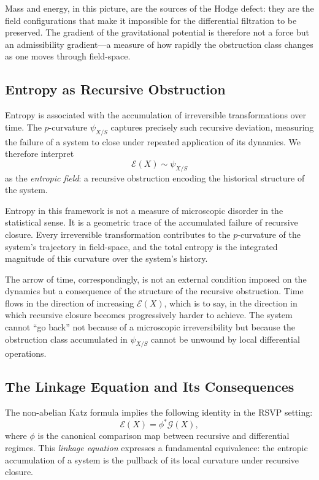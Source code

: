 \documentclass[12pt]{article}
\begin{document}
Mass and energy, in this picture, are the sources of the Hodge defect: they are
the field configurations that make it impossible for the differential filtration to be
preserved. The gradient of the gravitational potential is therefore not a force but an
admissibility gradient---a measure of how rapidly the obstruction class changes as one
moves through field-space.

\subsection{Entropy as Recursive Obstruction}

Entropy is associated with the accumulation of irreversible transformations over time.
The $p$-curvature $\psi_{X/S}$ captures precisely such recursive deviation, measuring
the failure of a system to close under repeated application of its dynamics. We
therefore interpret
\[
\mathcal{E}(X) \sim \psi_{X/S}
\]
as the \emph{entropic field}: a recursive obstruction encoding the historical structure
of the system.

Entropy in this framework is not a measure of microscopic disorder in the statistical
sense. It is a geometric trace of the accumulated failure of recursive closure. Every
irreversible transformation contributes to the $p$-curvature of the system's trajectory
in field-space, and the total entropy is the integrated magnitude of this curvature
over the system's history.

The arrow of time, correspondingly, is not an external condition imposed on the
dynamics but a consequence of the structure of the recursive obstruction. Time flows in
the direction of increasing $\mathcal{E}(X)$, which is to say, in the direction in
which recursive closure becomes progressively harder to achieve. The system cannot
``go back'' not because of a microscopic irreversibility but because the obstruction
class accumulated in $\psi_{X/S}$ cannot be unwound by local differential operations.

\subsection{The Linkage Equation and Its Consequences}

The non-abelian Katz formula implies the following identity in the RSVP setting:
\[
\mathcal{E}(X) = \phi^* \mathcal{G}(X),
\]
where $\phi$ is the canonical comparison map between recursive and differential regimes.
This \emph{linkage equation} expresses a fundamental equivalence: the entropic
accumulation of a system is the pullback of its local curvature under recursive
closure.
\end{document}

